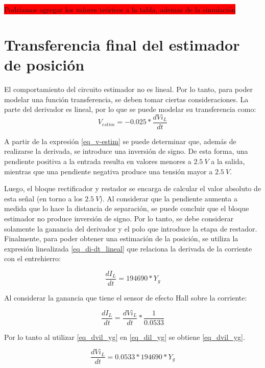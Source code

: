 \colorbox{red}{Podríamos agregar los valores teóricos a la tabla, ademas de la simulación}

\section{Transferencia final del estimador de posición}

El comportamiento del circuito estimador no es lineal.  Por lo tanto, para poder modelar una función transferencia, se deben tomar ciertas consideraciones. La parte del derivador es lineal, por lo que se puede modelar su transferencia como:
\begin{equation}\label{eq_v-estim}
	V_{estim}=-0.025*\frac{dVi_L}{dt} 
\end{equation}

A partir de la expresión \ref{eq_v-estim} se puede determinar que, además de realizarse la derivada, se introduce una inversión de signo. De esta forma, una pendiente positiva a la entrada resulta en valores menores a $2.5\:V$ a la salida, mientras que una pendiente negativa produce una tensión mayor a $2.5\:V$.

Luego, el bloque rectificador y restador se encarga de calcular el valor absoluto de esta señal (en torno a los $2.5\:V$). Al considerar que la pendiente aumenta a medida que lo hace la distancia de separación, se puede concluir que el bloque estimador no produce inversión de signo. Por lo tanto, se debe considerar solamente la ganancia del derivador y el polo que introduce la etapa de restador. Finalmente, para poder obtener una estimación de la posición, se utiliza la expresión linealizada \ref{eq_di-dt_lineal} que relaciona la derivada de la corriente con el entrehierro:

\begin{equation} \label{eq_dil_yg}
	\frac{dI_{L}}{dt} = 194690 * Y_{g}
\end{equation}


Al considerar la ganancia que tiene el sensor de efecto Hall sobre la corriente:

\begin{equation} \label{eq_dil_dvil}
	\frac{dI_{L}}{dt} =\frac{dVi_{L}}{dt}*\frac{1}{0.0533}
\end{equation}

Por lo tanto al utilizar \ref{eq_dvil_yg} en \ref{eq_dil_yg} se obtiene \ref{eq_dvil_yg}.

\begin{equation} \label{eq_dvil_yg}
	\frac{dVi_{L}}{dt} = 0.0533*194690*Y_{g}
\end{equation}


